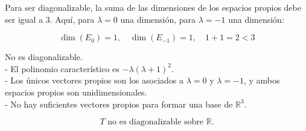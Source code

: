 \documentclass{article}
\theoremstyle{nonumberplain}
\begin{document}
Para ser diagonalizable, la suma de las dimensiones de los espacios propios debe ser igual a 3.  
Aquí, para \( \lambda = 0 \) una dimensión, para \( \lambda = -1 \) una dimensión:

\[
\dim(E_0) = 1, \quad \dim(E_{-1}) = 1,\quad 1 + 1 = 2 < 3
\]

No es diagonalizable. \\

- El polinomio característico es \( -\lambda (\lambda + 1)^2 \). \\
- Los únicos vectores propios son los asociados a \( \lambda = 0 \) y \( \lambda = -1 \), y ambos espacios propios son unidimensionales. \\
- No hay suficientes vectores propios para formar una base de \( \mathbb{R}^3 \).

\[
\boxed{
T \text{ no es diagonalizable sobre } \mathbb{R}.
}
\]
\end{document}
